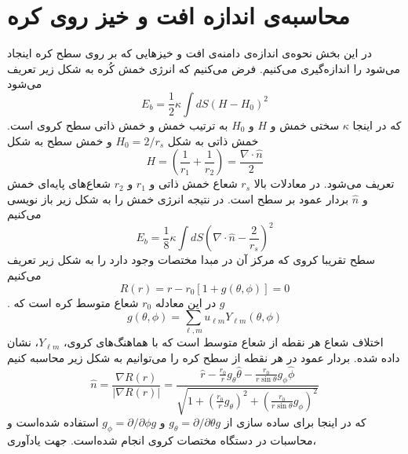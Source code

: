 \section{محاسبه‌ی اندازه افت و خیز روی کره}
در این بخش نحوه‌ی اندازه‌ی دامنه‌ی افت و خیزهایی که بر روی سطح کره اینجاد می‌شود را اندازه‌گیری می‌کنیم. 
\cite{safran1983}
فرض می‌کنیم که انرژی خمش کُره به شکل زیر تعریف می‌شود
\begin{equation}
E_{b}=\frac{1}{2}\kappa\int dS\left(H-H_0\right)^2
\end{equation}
 که در اینجا 
 $\kappa$
 سختی خمش و
 $H$
و 
$H_0$
به ترتیب خمش و خمش ذاتی سطح کروی است. خمش ذاتی به شکل 
$H_0=2/r_s$
و خمش سطح به شکل
\begin{equation}
H=\left(\frac{1}{r_1}+\frac{1}{r_2}\right)=\frac{\nabla\cdot\hat n}{2}
\end{equation}
تعریف می‌شود. در معادلات بالا 
$r_s$
شعاع خمش ذاتی و 
$r_1$ و $r_2$
شعاع‌های پایه‌ای خمش
و $\hat n$ بردار عمود بر سطح است. در نتیجه انرژی خمش را به شکل زیر باز نویسی می‌کنیم
\begin{equation}
E_{b}=\frac{1}{8}\kappa\int dS\left(\nabla\cdot\hat n-\frac{2}{r_s}\right)^2
\label{eq:ebforsubstitution}
\end{equation}
سطح تقریبا کروی که مرکز آن در مبدا مختصات وجود دارد را به شکل زیر تعریف می‌کنیم
\begin{equation}
R(r)= r-r_0\left[1+g(\theta,\phi)\right]=0
\label{eq:radiusdef}
\end{equation}
. در این معادله $r_0$ شعاع متوسط کره است که $g$
\begin{equation}
g(\theta,\phi)=\sum_{\ell,m}u_{\ell m}Y_{\ell m} (\theta,\phi)
\label{eq:gdef}
\end{equation}
اختلاف شعاع هر نقطه از شعاع متوسط است که با هماهنگ‌های کروی، $Y_{\ell m}$، نشان داده شده. بردار عمود در هر نقطه از سطح کره را می‌توانیم به شکل زیر محاسبه کنیم
\begin{equation}
\hat n = \frac{\nabla R(r)}{|\nabla R(r)|}= \frac{\hat r-\frac{r_0}{r}g_\theta \hat\theta-\frac{r_0}{r\sin\theta}g_\phi\hat\phi }{\sqrt{1+\left(\frac{r_0}{r}g_\theta\right)^2+\left(\frac{r_0}{r\sin\theta}g_\phi\right)^2 }}
\end{equation}
که در اینجا برای ساده سازی از
$g_\theta=\partial/\partial\theta g$
و
$g_\phi=\partial/\partial\phi g$
استفاده شده‌است و محاسبات در دستگاه مختصات کروی انجام شده‌است.
جهت یادآوری،
